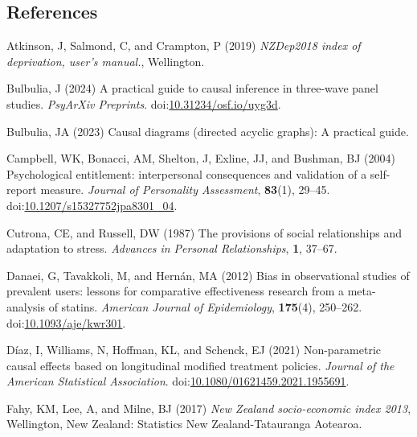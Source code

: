 \documentclass[
  singlecolumn]{article}
\newlength{\cslhangindent}
\newenvironment{CSLReferences}[2] %
 {\begin{list}{}{%
  \setlength{\itemindent}{0pt}
  \setlength{\leftmargin}{0pt}
  \setlength{\parsep}{0pt}
  \ifodd #1
   \setlength{\leftmargin}{\cslhangindent}
   \setlength{\itemindent}{-1\cslhangindent}
  \fi
  \setlength{\itemsep}{#2\baselineskip}}}
 {\end{list}}
\begin{document}
\newpage{}

\subsection{References}\label{references}

\label{refs}
\begin{CSLReferences}{1}{0}
Atkinson, J, Salmond, C, and Crampton, P (2019) \emph{NZDep2018 index of
deprivation, user{'}s manual.}, Wellington.

Bulbulia, J (2024) A practical guide to causal inference in three-wave
panel studies. \emph{PsyArXiv Preprints}.
doi:\href{https://doi.org/10.31234/osf.io/uyg3d}{10.31234/osf.io/uyg3d}.

Bulbulia, JA (2023) Causal diagrams (directed acyclic graphs): A
practical guide.

Campbell, WK, Bonacci, AM, Shelton, J, Exline, JJ, and Bushman, BJ
(2004) Psychological entitlement: interpersonal consequences and
validation of a self-report measure. \emph{Journal of Personality
Assessment}, \textbf{83}(1), 29--45.
doi:\href{https://doi.org/10.1207/s15327752jpa8301_04}{10.1207/s15327752jpa8301\_04}.

Cutrona, CE, and Russell, DW (1987) The provisions of social
relationships and adaptation to stress. \emph{Advances in Personal
Relationships}, \textbf{1}, 37--67.

Danaei, G, Tavakkoli, M, and Hernán, MA (2012) Bias in observational
studies of prevalent users: lessons for comparative effectiveness
research from a meta-analysis of statins. \emph{American Journal of
Epidemiology}, \textbf{175}(4), 250--262.
doi:\href{https://doi.org/10.1093/aje/kwr301}{10.1093/aje/kwr301}.

Díaz, I, Williams, N, Hoffman, KL, and Schenck, EJ (2021) Non-parametric
causal effects based on longitudinal modified treatment policies.
\emph{Journal of the American Statistical Association}.
doi:\href{https://doi.org/10.1080/01621459.2021.1955691}{10.1080/01621459.2021.1955691}.

Fahy, KM, Lee, A, and Milne, BJ (2017) \emph{New Zealand socio-economic
index 2013}, Wellington, New Zealand: Statistics New Zealand-Tatauranga
Aotearoa.


\end{CSLReferences}
\end{document}
